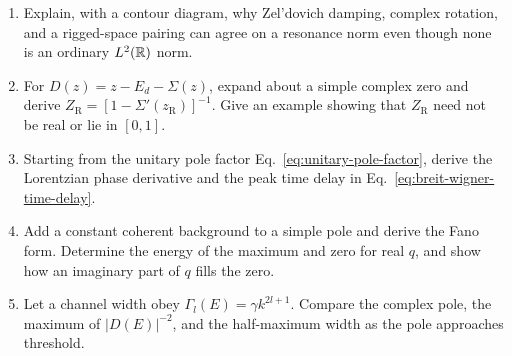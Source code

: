 \begin{enumerate}[label=\textbf{IV.\arabic*},leftmargin=*]
  \item Explain, with a contour diagram, why Zel'dovich damping, complex
  rotation, and a rigged-space pairing can agree on a resonance norm even
  though none is an ordinary $L^2(\mathbb{R})$ norm.

  \item For $D(z)=z-E_d-\Sigma(z)$, expand about a simple complex zero and
  derive $Z_{\mathrm R}=[1-\Sigma'(z_{\mathrm R})]^{-1}$.  Give an example
  showing that $Z_{\mathrm R}$ need not be real or lie in $[0,1]$.

  \item Starting from the unitary pole factor
  Eq.~\eqref{eq:unitary-pole-factor}, derive the Lorentzian phase derivative
  and the peak time delay in Eq.~\eqref{eq:breit-wigner-time-delay}.

  \item Add a constant coherent background to a simple pole and derive the
  Fano form.  Determine the energy of the maximum and zero for real $q$, and
  show how an imaginary part of $q$ fills the zero.

  \item Let a channel width obey $\Gamma_l(E)=\gamma k^{2l+1}$.  Compare the
  complex pole, the maximum of $|D(E)|^{-2}$, and the half-maximum width as
  the pole approaches threshold.
\end{enumerate}
